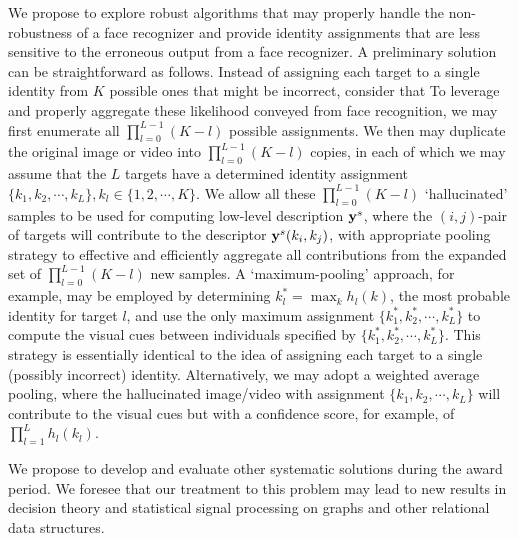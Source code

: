 We propose to explore robust algorithms that may properly handle the non-robustness of a face recognizer and provide identity assignments that are less sensitive to the erroneous output from a face recognizer. A preliminary solution can be straightforward as follows. Instead of assigning each target to a single identity from $K$ possible ones that might be incorrect, consider that To leverage and properly aggregate these likelihood conveyed from face recognition, we may first enumerate all $\prod_{l=0}^{L-1}(K-l)$ possible assignments. We then may duplicate the original image or video into $\prod_{l=0}^{L-1}(K-l)$ copies, in each of which we may assume that the $L$ targets have a determined identity assignment $\{k_1, k_2, \cdots, k_L\}, k_l\in\{1,2, \cdots, K\}$. We allow all these $\prod_{l=0}^{L-1}(K-l)$ `hallucinated' samples to be used for computing low-level description ${\bf y}^s$, where the $(i,j)$-pair of targets will contribute to the descriptor ${\bf y}^s(k_i,k_j)$, with appropriate pooling strategy to effective and efficiently aggregate all contributions from the expanded set of $\prod_{l=0}^{L-1}(K-l)$ new samples. A `maximum-pooling' approach, for example, may be employed by determining $k_l^{*}=\max_{k}h_l(k)$, the most probable identity for target $l$, and use the only maximum assignment $\{k_1^{*}, k_2^{*}, \cdots, k_L^{*}\}$ to compute the visual cues between individuals specified by $\{k_1^{*}, k_2^{*}, \cdots, k_L^{*}\}$. This strategy is essentially identical to the idea of assigning each target to a single (possibly incorrect) identity. Alternatively, we may adopt a weighted average pooling, where the hallucinated image/video with assignment $\{k_1, k_2, \cdots, k_L\}$ will contribute to the visual cues but with a confidence score, for example, of $\prod_{l=1}^{L}h_l(k_l)$.

We propose to develop and evaluate other systematic solutions during the award period. We foresee that our treatment to this problem may lead to new results in decision theory and statistical signal processing on graphs and other relational data structures.

